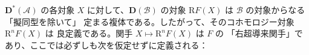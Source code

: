 $\mathbf D^*(\mathcal A)$ の各対象 $X$ に対して、$\mathbf D(\mathcal B)$
の対象 $\mathrm RF(X)$ は $\mathcal B$ の対象からなる「擬同型を除いて」
定まる複体である。したがって、そのコホモロジー対象 $\mathrm R^nF(X)$ は
良定義である。関手 $X\longmapsto\mathrm R^nF(X)$ は $F$ の
「右超導来関手」であり、ここでは必ずしも次を仮定せずに定義される：
